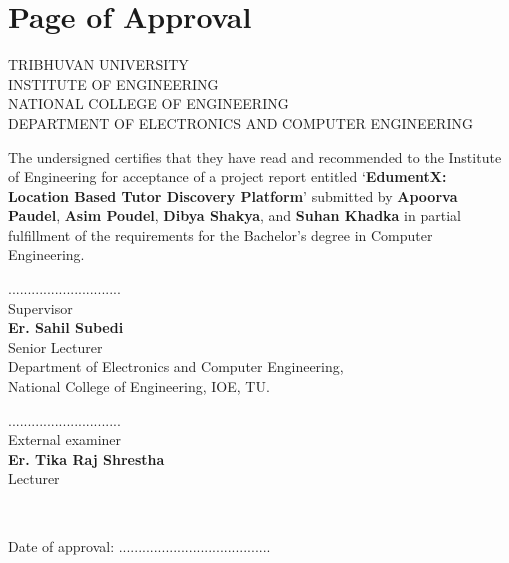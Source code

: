 \documentclass[12pt]{report}
\begin{document}
\sloppy


\setcounter{page}{2}

\chapter*{Page of Approval}
\vspace{1.0cm}
\begin{center}
\uppercase{
Tribhuvan University\\
Institute of Engineering\\
National College of Engineering\\
Department of Electronics and Computer Engineering
}
\end{center}
\vspace{.8cm}
The undersigned certifies that they have read and recommended to the Institute of Engineering for acceptance of a project report entitled `\textbf{EdumentX: Location Based Tutor Discovery Platform}' submitted by \textbf{Apoorva Paudel}, \textbf{Asim Poudel}, \textbf{Dibya Shakya}, and \textbf{Suhan Khadka} in partial fulfillment of the requirements for the Bachelor's degree in Computer Engineering.\\

\vspace{1.5cm}
\noindent
\begin{minipage}[t]{0.48\textwidth}
\raggedright
.............................\\
Supervisor\\[0.15cm]
\textbf{Er. Sahil Subedi}\\
Senior Lecturer\\
Department of Electronics and Computer Engineering,\\
National College of Engineering, IOE, TU.
\end{minipage}%
\hfill
\begin{minipage}[t]{0.48\textwidth}
\raggedleft
.............................\\
External examiner\\[0.15cm]
\textbf{Er. Tika Raj Shrestha}\\
Lecturer
\end{minipage}\\

\vspace{2.0cm}
\centerline{Date of approval: .......................................}
\end{document}
